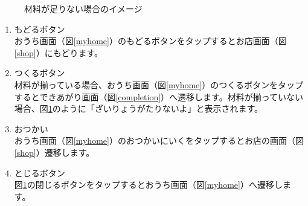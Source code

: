 \documentclass[a4j]{jarticle}
\begin{document}
\begin{figure}[H]
\begin{minipage}{0.5\hsize}
\begin{center}
   \caption{材料が足りない場合のイメージ}
   \label{otukai6}
  \end{center}
 \end{minipage}
\end{figure}

\begin{enumerate}
  \renewcommand{\labelenumi}{\textcircled{\scriptsize \theenumi}}
\item もどるボタン\\
  おうち画面（図\ref{myhome}）のもどるボタンをタップするとお店画面（図\ref{shop}）にもどります。
\item つくるボタン\\
  材料が揃っている場合、おうち画面（図\ref{myhome}）のつくるボタンをタップするとできあがり画面（図\ref{completion}）へ遷移します。材料が揃っていない場合、図\ref{otukai6}のように「ざいりょうがたりないよ」と表示されます。
\item おつかい\\
  おうち画面（図\ref{myhome}）のおつかいにいくをタップするとお店の画面（図\ref{shop}）遷移します。
\item とじるボタン\\
  図\ref{otukai6}の閉じるボタンをタップするとおうち画面（図\ref{myhome}）へ遷移します。
\end{enumerate}
\end{document}
